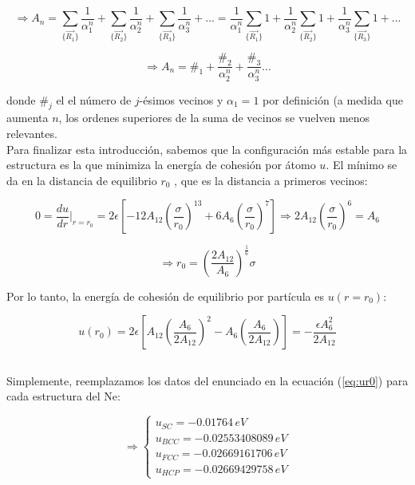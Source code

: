 \documentclass[a4paper]{article}
\begin{document}
\begin{equation}
\label{eq:an2}
\Rightarrow A_{n} = \sum_{\{\vec{R_{1}}\}} \frac{1}{\alpha_{1}^{n}} + \sum_{\{\vec{R_{2}}\}} \frac{1}{\alpha_{2}^{n}} + \sum_{\{\vec{R_{3}}\}} \frac{1}{\alpha_{3}^{n}} + ... = \frac{1}{\alpha_{1}^{n}}\sum_{\{\vec{R_{1}}\}} 1 + \frac{1}{\alpha_{2}^{n}}\sum_{\{\vec{R_{2}}\}} 1 + \frac{1}{\alpha_{3}^{n}}\sum_{\{\vec{R_{3}}\}} 1 + ...
\end{equation}

\begin{equation}
\label{eq:an3}
\Rightarrow A_{n} = \#_{1} + \frac{\#_{2}}{\alpha_{2}^{n}} + \frac{\#_{3}}{\alpha_{3}^{n}} ...
\end{equation}

donde $\#_{j}$ el el n\'umero de $j$-\'esimos vecinos y $\alpha_{1} = 1$ por definici\'on (a medida que aumenta $n$, los ordenes superiores de la suma de vecinos se vuelven menos relevantes.\\

Para finalizar esta introducci\'on, sabemos que la configuraci\'on m\'as estable para la estructura es la que minimiza la energ\'ia de cohesi\'on por \'atomo $u$. El m\'inimo se da en la distancia de equilibrio $r_{0}$ , que es la distancia a primeros vecinos:

$$ 0 = \frac{du}{dr}\bigg|_{r = r_{0}} = 2\epsilon\left[ -12A_{12}\left(\frac{\sigma}{r_{0}}\right)^{13} + 6A_{6}\left(\frac{\sigma}{r_{0}}\right)^{7} \right] \Rightarrow 2A_{12}\left(\frac{\sigma}{r_{0}}\right)^{6} = A_{6}$$

$$ \Rightarrow r_{0} = \left( \frac{2A_{12}}{A_{6}}\right)^{\frac{1}{6}}\sigma$$

Por lo tanto, la energía de cohesi\'on de equilibrio por part\'icula es $u(r = r_{0})$:

\begin{equation}
\label{eq:ur0}
u(r_{0}) = 2\epsilon\left[ A_{12}\left(\frac{A_{6}}{2A_{12}}\right)^{2} - A_{6}\left(\frac{A_{6}}{2A_{12}}\right) \right] = -\frac{\epsilon A_{6}^{2}}{2A_{12}}
\end{equation}


\subsection{}

Simplemente, reemplazamos los datos del enunciado en la ecuaci\'on (\ref{eq:ur0}) para cada estructura del Ne:

$$\Rightarrow \begin{cases}
u_{SC} = -0.01764\, eV \\
u_{BCC} = -0.02553408089\, eV \\
u_{FCC} = -0.02669161706\, eV \\
u_{HCP} = -0.02669429758\, eV
\end{cases}$$
\\
\end{document}

